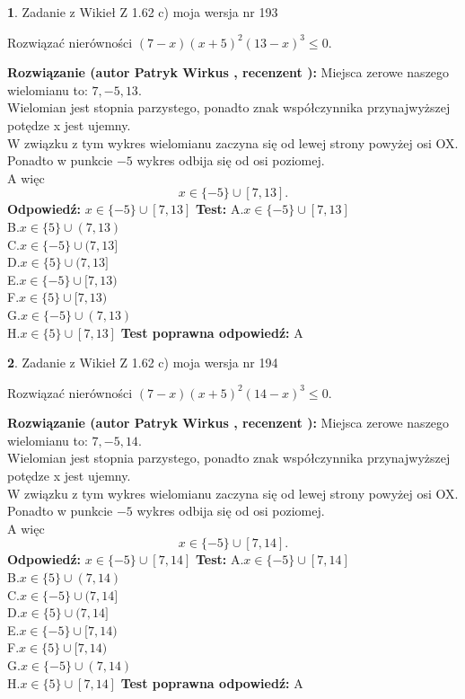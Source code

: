 \documentclass[12pt, a4paper]{article}
\theoremstyle{definition} %
\newtheorem{zad}{}
\newcommand{\zadStart}[1]{\begin{zad}#1\newline}
\newcommand{\zadStop}{\end{zad}}
\newcommand{\rozwStart}[2]{\noindent \textbf{Rozwiązanie (autor #1 , recenzent #2): }\newline}
\newcommand{\rozwStop}{\newline}
\newcommand{\odpStart}{\noindent \textbf{Odpowiedź:}\newline}
\newcommand{\odpStop}{\newline}
\newcommand{\testStart}{\noindent \textbf{Test:}\newline}
\newcommand{\testStop}{\newline}
\newcommand{\kluczStart}{\noindent \textbf{Test poprawna odpowiedź:}\newline}
\newcommand{\kluczStop}{\newline}
\begin{document}
\zadStart{Zadanie z Wikieł Z 1.62 c) moja wersja nr 193}

Rozwiązać nierówności $(7-x)(x+5)^{2}(13-x)^{3}\le0$.
\zadStop
\rozwStart{Patryk Wirkus}{}
Miejsca zerowe naszego wielomianu to: $7, -5, 13$.\\
Wielomian jest stopnia parzystego, ponadto znak współczynnika przy\linebreak najwyższej potędze x jest ujemny.\\ W związku z tym wykres wielomianu zaczyna się od lewej strony powyżej osi OX.\\
Ponadto w punkcie $-5$ wykres odbija się od osi poziomej.\\
A więc $$x \in \{-5\} \cup [7,13].$$
\rozwStop
\odpStart
$x \in \{-5\} \cup [7,13]$
\odpStop
\testStart
A.$x \in \{-5\} \cup [7,13]$\\
B.$x \in \{5\} \cup (7,13)$\\
C.$x \in \{-5\} \cup (7,13]$\\
D.$x \in \{5\} \cup (7,13]$\\
E.$x \in \{-5\} \cup [7,13)$\\
F.$x \in \{5\} \cup [7,13)$\\
G.$x \in \{-5\} \cup (7,13)$\\
H.$x \in \{5\} \cup [7,13]$
\testStop
\kluczStart
A
\kluczStop



\zadStart{Zadanie z Wikieł Z 1.62 c) moja wersja nr 194}

Rozwiązać nierówności $(7-x)(x+5)^{2}(14-x)^{3}\le0$.
\zadStop
\rozwStart{Patryk Wirkus}{}
Miejsca zerowe naszego wielomianu to: $7, -5, 14$.\\
Wielomian jest stopnia parzystego, ponadto znak współczynnika przy\linebreak najwyższej potędze x jest ujemny.\\ W związku z tym wykres wielomianu zaczyna się od lewej strony powyżej osi OX.\\
Ponadto w punkcie $-5$ wykres odbija się od osi poziomej.\\
A więc $$x \in \{-5\} \cup [7,14].$$
\rozwStop
\odpStart
$x \in \{-5\} \cup [7,14]$
\odpStop
\testStart
A.$x \in \{-5\} \cup [7,14]$\\
B.$x \in \{5\} \cup (7,14)$\\
C.$x \in \{-5\} \cup (7,14]$\\
D.$x \in \{5\} \cup (7,14]$\\
E.$x \in \{-5\} \cup [7,14)$\\
F.$x \in \{5\} \cup [7,14)$\\
G.$x \in \{-5\} \cup (7,14)$\\
H.$x \in \{5\} \cup [7,14]$
\testStop
\kluczStart
A
\kluczStop
\end{document}
